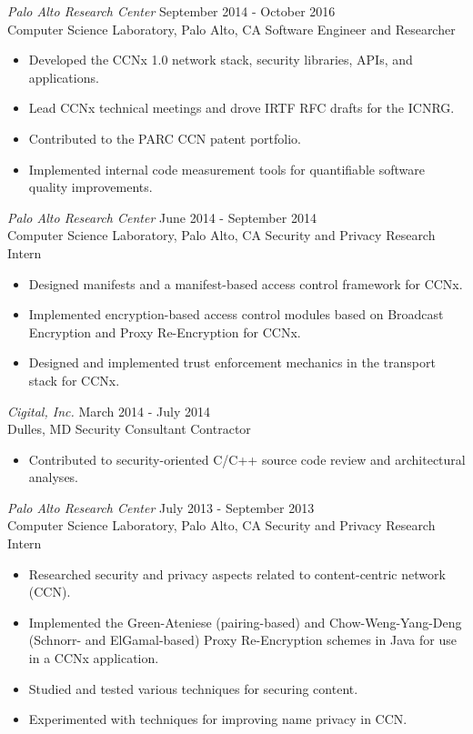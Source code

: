 \documentclass[10pt]{res} %
\begin{document}
\begin{resume}
{\sl Palo Alto Research Center} \hfill September 2014 - October 2016 \\
Computer Science Laboratory, Palo Alto, CA \hfill Software Engineer and Researcher
\begin{itemize} \itemsep -2pt %
\item Developed the CCNx 1.0 network stack, security libraries, APIs, and applications.
\item Lead CCNx technical meetings and drove IRTF RFC drafts for the ICNRG.
\item Contributed to the PARC CCN patent portfolio.
\item Implemented internal code measurement tools for quantifiable software quality improvements.
\end{itemize}

{\sl Palo Alto Research Center} \hfill June 2014 - September 2014 \\
Computer Science Laboratory, Palo Alto, CA \hfill Security and Privacy Research Intern
\begin{itemize} \itemsep -2pt %
\item Designed manifests and a manifest-based access control framework for CCNx.
\item Implemented encryption-based access control modules based on Broadcast Encryption and Proxy Re-Encryption for CCNx.
\item Designed and implemented trust enforcement mechanics in the transport stack for CCNx.
\end{itemize}

{\sl Cigital, Inc.} \hfill March 2014 - July 2014 \\
Dulles, MD \hfill Security Consultant Contractor
\begin{itemize} \itemsep -2pt %
\item Contributed to security-oriented C/C++ source code review and architectural analyses.
\end{itemize}

{\sl Palo Alto Research Center} \hfill July 2013 - September 2013 \\
Computer Science Laboratory, Palo Alto, CA \hfill Security and Privacy Research Intern
\begin{itemize} \itemsep -2pt %
\item Researched security and privacy aspects related to content-centric network (CCN).
\item Implemented the Green-Ateniese (pairing-based) and Chow-Weng-Yang-Deng (Schnorr- and ElGamal-based) Proxy Re-Encryption schemes in Java for use in a CCNx application.
\item Studied and tested various techniques for securing content.
\item Experimented with techniques for improving name privacy in CCN.
\end{itemize}


\end{resume}
\end{document}
